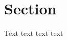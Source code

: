 \documentclass{article}
\begin{document}
\section{Section}
Text \cite{knuth_fa} text text text

\printbibliography
\end{document}
